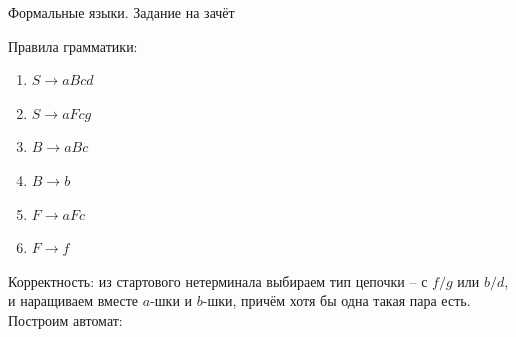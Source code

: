 \documentclass[12pt]{article}
\begin{document}
\begin{center} {\LARGE Формальные языки. Задание на зачёт} \end{center}

\bigskip

 Правила грамматики: 
\begin{myquote}
\begin{enumerate}
\item $S \to aBcd$
\item $S \to aFcg$
\item $B \to aBc$
\item $B \to b$
\item $F \to aFc$
\item $F \to f$
\end{enumerate}
\end{myquote}
Корректность: из стартового нетерминала выбираем тип цепочки -- с $f/g$ или $b/d$, и наращиваем вместе $a$-шки и $b$-шки, причём хотя бы одна такая пара есть.\\

Построим автомат:\\
\end{document}
